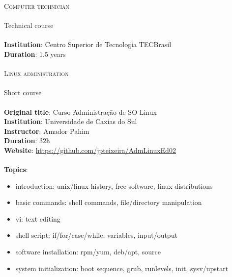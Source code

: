\noindent
\textsc{\Large Computer technician} \\\\
Technical course \\\\
\textbf{Institution}: Centro Superior de Tecnologia TECBrasil \\
\textbf{Duration}: 1.5 years \\\\

\noindent
\textsc{\Large Linux administration} \\\\
Short course \\\\
\textbf{Original title}: Curso Administração de SO Linux \\
\textbf{Institution}: Universidade de Caxias do Sul \\
\textbf{Instructor}: Amador Pahim \\
\textbf{Duration}: 32h \\
\textbf{Website}: \url{https://github.com/jpteixeira/AdmLinuxEd02} \\\\
\textbf{Topics}:
    \begin{itemize}
        \vspace{-2.5mm}
        \itemsep-1mm
        \item introduction: unix/linux history, free software, linux
            distributions
        \item basic commands: shell commands, file/directory manipulation
        \item vi: text editing
        \item shell script: if/for/case/while, variables, input/output
        \item software installation: rpm/yum, deb/apt, source
        \item system initialization: boot sequence, grub, runlevels, init,
            sysv/upstart
    \end{itemize}
\vspace{5mm}

